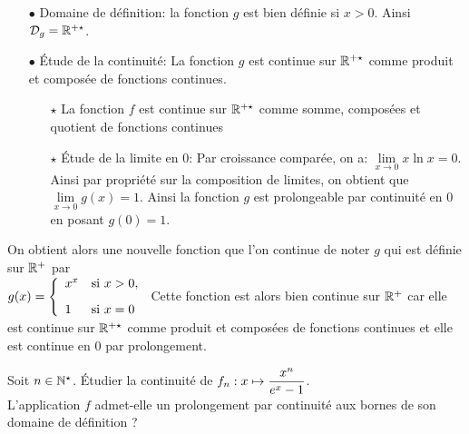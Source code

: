\documentclass[a4paper, 11pt,reqno]{article}
\begin{document}
\begin{correction}
\begin{enumerate}
\begin{itemize}
\item[$\bullet$] Domaine de d\'efinition: la fonction $g$ est bien d\'efinie si $x>0$. Ainsi $\mathcal{D}_g=\mathbb{R}^{+\star}$.
\item[$\bullet$] \'Etude de la continuit\'e: La fonction $g$ est continue sur $\mathbb{R}^{+\star}$ comme produit et compos\'ee de fonctions continues.
\begin{itemize}
\item[$\star$] La fonction $f$ est continue sur $\mathbb{R}^{+\star}$ comme somme, compos\'ees et quotient de fonctions continues
\item[$\star$] \'Etude de la limite en $0$: Par croissance compar\'ee, on a: $\lim\limits_{x\to 0} x\ln{x}=0$. Ainsi par propri\'et\'e sur la composition de limites, on obtient que $\lim\limits_{x\to 0} g(x)=1$. Ainsi la fonction $g$ est prolongeable par continuit\'e en $0$ en posant $g(0)=1$.
\end{itemize}
\end{itemize}
On obtient alors une nouvelle fonction que l'on continue de noter $g$ qui est d\'efinie sur $\mathbb{R}^+$ par\\
\noindent  $g(x)=\left\lbrace \begin{array}{ll} x^x & \hbox{si}\ x>0,\vsec\\ 1& \hbox{si}\ x=0 \end{array}\right.$ Cette fonction est alors bien continue sur $\mathbb{R}^+$ car elle est continue sur $\mathbb{R}^{+\star}$ comme produit et compos\'ees de fonctions continues et elle est continue en $0$ par prolongement.
\end{enumerate}
\end{correction}
\begin{exercice}   \;
	Soit $n\in\mathbb{N}^{\star}$. \'Etudier la continuit\'e de $f_n: x\mapsto \displaystyle\frac{x^n}{e^x-1}$.\\
	L'application $f$ admet-elle un prolongement par continuit\'e aux bornes de son domaine de d\'efinition ?
\end{exercice}
\end{document}
